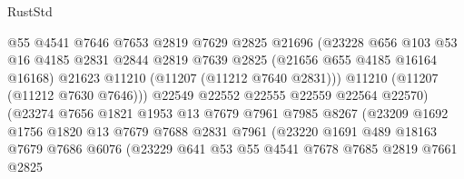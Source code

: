 \begin{lexlean}{RustStd}
\begin{coremodule}
                                @55
                                @4541
                                @7646
                                @7653
                                @2819
                                @7629
                                @2825
                                @21696
                                (@23228
                                  @656
                                  @103
                                  @53
                                  @16
                                  @4185
                                  @2831
                                  @2844
                                  @2819
                                  @7639
                                  @2825
                                  (@21656 @655 @4185 @16164 @16168)
                                  @21623
                                  @11210
                                  (@11207 (@11212 @7640 @2831)))
                                @11210
                                (@11207 (@11212 @7630 @7646)))
                              @22549
                              @22552
                              @22555
                              @22559
                              @22564
                              @22570)
                            (@23274
                              @7656
                              @1821
                              @1953
                              @13
                              @7679
                              @7961
                              @7985
                              @8267
                              (@23209
                                @1692
                                @1756
                                @1820
                                @13
                                @7679
                                @7688
                                @2831
                                @7961
                                (@23220
                                  @1691
                                  @489
                                  @18163
                                  @7679
                                  @7686
                                  @6076
                                  (@23229
                                    @641
                                    @53
                                    @55
                                    @4541
                                    @7678
                                    @7685
                                    @2819
                                    @7661
                                    @2825

\end{coremodule}
\end{lexlean}
